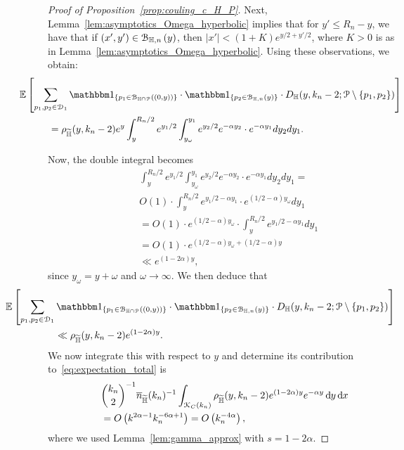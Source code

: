\begin{proof}[Proof of Proposition~\ref{prop:couling_c_H_P}]
Next, Lemma~\ref{lem:asymptotics_Omega_hyperbolic} implies that for $y'\leq R_n -y$, we have that if $(x',y') \in {\mathcal B}_{\mathbb{H},n}\left(y\right)$, then $|x'| < (1+ K) e^{y/2 + y'/2}$, where $K >0$ is as in Lemma~\ref{lem:asymptotics_Omega_hyperbolic}. Using these observations, we obtain: 
\begin{align*}
	&\hspace{-30pt} \Exp{\sum_{p_1, p_2\in \dom{1}} \ind{p_1 \in \BallInter{(0,y)}} \cdot \ind{p_2 \in \BallHyp{y}} \cdot 
	D_\H (y,k_n-2;\Pcal \setminus \{p_1, p_2\})} \\
	&= \rho_{\HP}(y,k_n-2)
	e^{y}\int_y^{R_n/2} e^{y_1/2}\int_{y_\omega}^{y_1} e^{y_2/2} e^{-\alpha y_2} \cdot e^{-\alpha y_1} dy_2 dy_1.
\end{align*}

Now, the double integral becomes
\begin{equation}
\begin{split}
& \int_y^{R_n/2} e^{y_1/2}\int_{y_\omega}^{y_1} e^{y_2/2} e^{-\alpha y_2} \cdot e^{-\alpha y_1} dy_2 dy_1 = \\
&  O(1) \cdot  \int_y^{R_n/2} e^{y_1/2 - \alpha y_1} \cdot 
e^{(1/2 - \alpha) y_\omega} dy_1 \\
& =O(1) \cdot e^{(1/2 - \alpha) y_\omega} \cdot \int_y^{R_n/2} e^{y_1/2 - \alpha y_1} d y_1 \\
& =O(1) \cdot e^{(1/2 - \alpha) y_\omega + (1/2 - \alpha) y} \\ 
& \ll e^{(1 - 2\alpha) y},
\end{split}
\end{equation}
since $y_\omega = y + \omega$ and $\omega \to \infty$. 
We then deduce that 
\begin{equation}
\begin{split}
&\hspace{-50pt}\Exp{\sum_{p_1, p_2\in \dom{1}} \ind{p_1 \in \BallInter{(0,y)}} \cdot \ind{p_2 \in \BallHyp{y}} \cdot 
D_\H (y,k_n-2;\Pcal \setminus \{p_1, p_2\})}\\
& \ll \rho_{\HP}(y,k_n-2) e^{(1-2\alpha)y}.
\end{split}
\end{equation}
We now integrate this with respect to $y$ and determine its contribution to~\eqref{eq:expectation_total} is 
\begin{align*} 
	&{k_n \choose 2}^{-1} \overline{n}_{\widetilde{\mathbb{H}}}(k_n)^{-1} \int_{{\mathcal K}_{C}(k_n)} \rho_{\widetilde{\mathbb{H}}}(y,k_n-2) e^{(1-2\alpha)y} e^{-\alpha y} \operatorname{\mathrm{d}\hspace{-2pt}} y \operatorname{\mathrm{d}\hspace{-2pt}} x \\
	&= O\left(k^{2\alpha - 1} k_n^{-6\alpha + 1}\right) = O\left(k_n^{-4\alpha}\right),
\end{align*}
where we used Lemma~\ref{lem:gamma_approx} with $s = 1 - 2\alpha$.


\end{proof}
